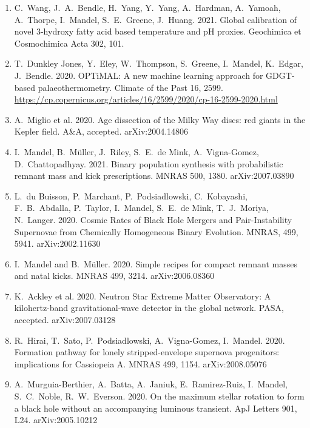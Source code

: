 \documentclass[margin,line]{res}
\begin{document}
\begin{resume}
\begin{enumerate}
\item C.~Wang, J.~A.~Bendle,  H.~Yang, Y.~Yang, A.~Hardman, A.~Yamoah, A.~Thorpe, I.~Mandel, S.~E.~Greene, J.~Huang.  2021. Global calibration of novel 3-hydroxy fatty acid based temperature and pH proxies.  Geochimica et Cosmochimica Acta 302, 101. 

\item T.~Dunkley Jones, Y.~Eley, W.~Thompson, S.~Greene, I.~Mandel, K.~Edgar, J.~Bendle.  2020.  OPTiMAL: A new machine learning approach for GDGT-based palaeothermometry.  Climate of the Past 16, 2599.  \url{https://cp.copernicus.org/articles/16/2599/2020/cp-16-2599-2020.html}

\item A.~Miglio et al. 2020. Age dissection of the Milky Way discs: red giants in the Kepler field.  A\&A, accepted.  arXiv:2004.14806

\item I.~Mandel, B.~M\"{u}ller, J.~Riley, S.~E.~de Mink, A.~Vigna-Gomez, D.~Chattopadhyay. 2021.  Binary population synthesis with probabilistic remnant mass and kick prescriptions. MNRAS 500, 1380.   arXiv:2007.03890

\item L.~du Buisson, P.~Marchant, P.~Podsiadlowski, C.~Kobayashi, F.~B.~Abdalla, P.~Taylor, I.~Mandel, S.~E.~de Mink, T.~J.~Moriya, N.~Langer.  2020. Cosmic Rates of Black Hole Mergers and Pair-Instability Supernovae from Chemically Homogeneous Binary Evolution. MNRAS, 499, 5941.  arXiv:2002.11630

\item I.~Mandel and B.~M\"{u}ller. 2020. Simple recipes for compact remnant masses and natal kicks.  MNRAS 499, 3214.  arXiv:2006.08360

\item K.~Ackley et al. 2020. Neutron Star Extreme Matter Observatory: A kilohertz-band gravitational-wave detector in the global network. PASA, accepted.  arXiv:2007.03128 

\item R.~Hirai, T.~Sato, P.~Podsiadlowski, A.~Vigna-Gomez, I.~Mandel. 2020. Formation pathway for lonely stripped-envelope supernova progenitors: implications for Cassiopeia A.  MNRAS 499, 1154. arXiv:2008.05076

\item A.~Murguia-Berthier, A.~Batta, A.~Janiuk, E.~Ramirez-Ruiz, I.~Mandel, S.~C.~Noble, R.~W.~Everson.  2020.  On the maximum stellar rotation to form a black hole without an accompanying luminous transient.  ApJ Letters 901, L24.  arXiv:2005.10212


\end{enumerate}
\end{resume}
\end{document}
